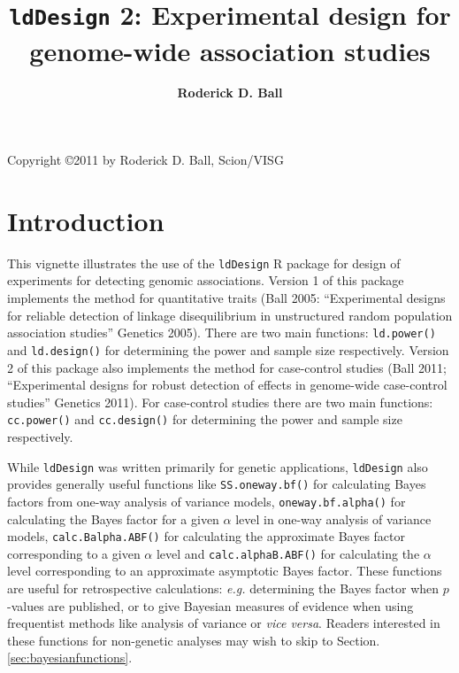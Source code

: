 \documentclass[a4paper,10pt]{amsart}
\def\ldDesign{\texttt{ldDesign}}
\def\eg{\textit{e.g.}}
\begin{document}

\title{\ldDesign{} 2: Experimental design for genome-wide association studies}
\author{
\bf Roderick D. Ball
}
\date{}
\maketitle
\vspace*{5.5in}
Copyright \copyright 2011  by Roderick D. Ball, Scion/VISG
\pagebreak
\tableofcontents

\section{Introduction}

This vignette illustrates the use of the \ldDesign{} R package for
design of experiments for detecting genomic associations.  Version 1
of this package implements the method for quantitative traits (Ball
2005: ``Experimental designs for reliable detection of linkage
disequilibrium in unstructured random population association studies''
Genetics 2005). There are two main functions: \texttt{ld.power()} and
\texttt{ld.design()} for determining the power and sample size
respectively.  Version 2 of this package also implements the method
for case-control studies (Ball 2011; ``Experimental designs for robust
detection of effects in genome-wide case-control studies'' Genetics
2011).  For case-control studies there are two main functions:
\texttt{cc.power()} and \texttt{cc.design()} for determining the power
and sample size respectively.  

While \ldDesign{} was written primarily for genetic applications,
\ldDesign{} also provides generally useful functions like
\texttt{SS.oneway.bf()} for calculating Bayes factors from one-way
analysis of variance models, \texttt{oneway.bf.alpha()} for
calculating the Bayes factor for a given $\alpha$ level in one-way
analysis of variance models, \texttt{calc.Balpha.ABF()} for
calculating the approximate Bayes factor corresponding to a given
$\alpha$ level and \texttt{calc.alphaB.ABF()} for calculating the
$\alpha$ level corresponding to an approximate asymptotic Bayes
factor.  These functions are useful for retrospective calculations:
\eg{} determining the Bayes factor when $p$-values are published, or to
give Bayesian measures of evidence when using frequentist methods like
analysis of variance or \textit{vice versa}.  Readers interested in these
functions for non-genetic analyses may wish to skip to
Section. \ref{sec:bayesianfunctions}.
\end{document}
